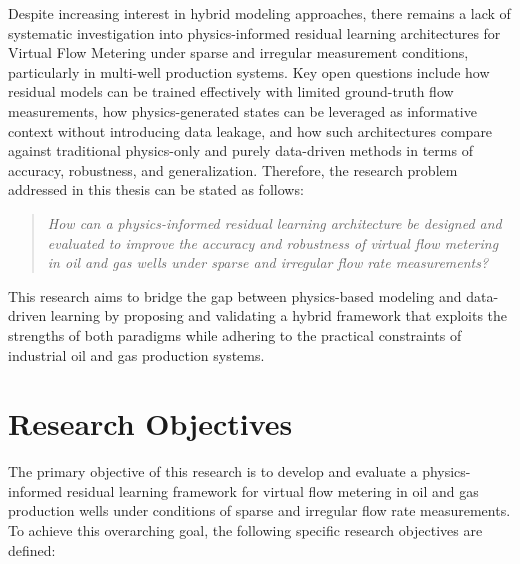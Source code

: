 \documentclass[12pt,APA]{uomthesis}
\begin{document}
Despite increasing interest in hybrid modeling approaches, there remains a lack of systematic investigation into physics-informed residual learning architectures for Virtual Flow Metering under sparse and irregular measurement conditions, particularly in multi-well production systems. 
Key open questions include how residual models can be trained effectively with limited ground-truth flow measurements, how physics-generated states can be leveraged as informative context without introducing data leakage, and how such architectures compare against traditional physics-only and purely data-driven methods in terms of accuracy, robustness, and generalization.
Therefore, the research problem addressed in this thesis can be stated as follows:

\begin{quote}
\textit{How can a physics-informed residual learning architecture be designed and evaluated to improve the accuracy and robustness of virtual flow metering in oil and gas wells under sparse and irregular flow rate measurements?}
\end{quote}

This research aims to bridge the gap between physics-based modeling and data-driven learning by proposing and validating a hybrid framework that exploits the strengths of both paradigms while adhering to the practical constraints of industrial oil and gas production systems.

\section{Research Objectives}
\label{sec:objectives}
The primary objective of this research is to develop and evaluate a physics-informed residual learning framework for virtual flow metering in oil and gas production wells under conditions of sparse and irregular flow rate measurements. To achieve this overarching goal, the following specific research objectives are defined:
\end{document}
